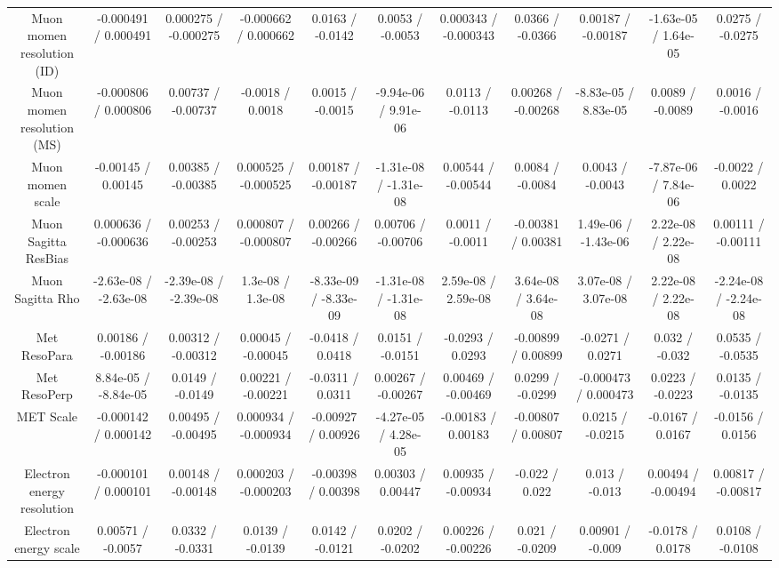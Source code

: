 {\begin{landscape}
\begin{longtable}{@{\extracolsep{\fill}}| *{11}{c|}}
  Muon momen resolution (ID) & -0.000491 / 0.000491 & 0.000275 / -0.000275 & -0.000662 / 0.000662 & 0.0163 / -0.0142 & 0.0053 / -0.0053 & 0.000343 / -0.000343 & 0.0366 / -0.0366 & 0.00187 / -0.00187 & -1.63e-05 / 1.64e-05 & 0.0275 / -0.0275 \\ 
  Muon momen resolution (MS) & -0.000806 / 0.000806 & 0.00737 / -0.00737 & -0.0018 / 0.0018 & 0.0015 / -0.0015 & -9.94e-06 / 9.91e-06 & 0.0113 / -0.0113 & 0.00268 / -0.00268 & -8.83e-05 / 8.83e-05 & 0.0089 / -0.0089 & 0.0016 / -0.0016 \\ 
  Muon momen scale & -0.00145 / 0.00145 & 0.00385 / -0.00385 & 0.000525 / -0.000525 & 0.00187 / -0.00187 & -1.31e-08 / -1.31e-08 & 0.00544 / -0.00544 & 0.0084 / -0.0084 & 0.0043 / -0.0043 & -7.87e-06 / 7.84e-06 & -0.0022 / 0.0022 \\ 
  Muon Sagitta ResBias & 0.000636 / -0.000636 & 0.00253 / -0.00253 & 0.000807 / -0.000807 & 0.00266 / -0.00266 & 0.00706 / -0.00706 & 0.0011 / -0.0011 & -0.00381 / 0.00381 & 1.49e-06 / -1.43e-06 & 2.22e-08 / 2.22e-08 & 0.00111 / -0.00111 \\ 
  Muon Sagitta Rho & -2.63e-08 / -2.63e-08 & -2.39e-08 / -2.39e-08 & 1.3e-08 / 1.3e-08 & -8.33e-09 / -8.33e-09 & -1.31e-08 / -1.31e-08 & 2.59e-08 / 2.59e-08 & 3.64e-08 / 3.64e-08 & 3.07e-08 / 3.07e-08 & 2.22e-08 / 2.22e-08 & -2.24e-08 / -2.24e-08 \\ 
  Met ResoPara & 0.00186 / -0.00186 & 0.00312 / -0.00312 & 0.00045 / -0.00045 & -0.0418 / 0.0418 & 0.0151 / -0.0151 & -0.0293 / 0.0293 & -0.00899 / 0.00899 & -0.0271 / 0.0271 & 0.032 / -0.032 & 0.0535 / -0.0535 \\ 
  Met ResoPerp & 8.84e-05 / -8.84e-05 & 0.0149 / -0.0149 & 0.00221 / -0.00221 & -0.0311 / 0.0311 & 0.00267 / -0.00267 & 0.00469 / -0.00469 & 0.0299 / -0.0299 & -0.000473 / 0.000473 & 0.0223 / -0.0223 & 0.0135 / -0.0135 \\ 
  MET Scale & -0.000142 / 0.000142 & 0.00495 / -0.00495 & 0.000934 / -0.000934 & -0.00927 / 0.00926 & -4.27e-05 / 4.28e-05 & -0.00183 / 0.00183 & -0.00807 / 0.00807 & 0.0215 / -0.0215 & -0.0167 / 0.0167 & -0.0156 / 0.0156 \\ 
  Electron energy resolution & -0.000101 / 0.000101 & 0.00148 / -0.00148 & 0.000203 / -0.000203 & -0.00398 / 0.00398 & 0.00303 / 0.00447 & 0.00935 / -0.00934 & -0.022 / 0.022 & 0.013 / -0.013 & 0.00494 / -0.00494 & 0.00817 / -0.00817 \\ 
  Electron energy scale & 0.00571 / -0.0057 & 0.0332 / -0.0331 & 0.0139 / -0.0139 & 0.0142 / -0.0121 & 0.0202 / -0.0202 & 0.00226 / -0.00226 & 0.021 / -0.0209 & 0.00901 / -0.009 & -0.0178 / 0.0178 & 0.0108 / -0.0108 \\ 

\end{longtable}
\end{landscape}}
